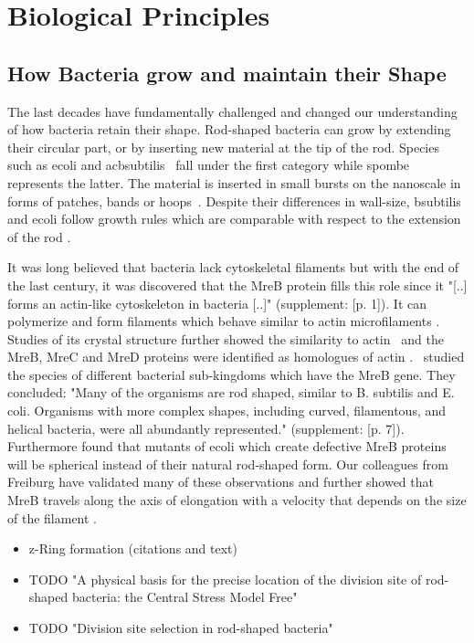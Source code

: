 \documentclass{article}
\begin{document}
\section{Biological Principles}
\subsection{How Bacteria grow and maintain their Shape}

The last decades have fundamentally challenged and changed our understanding of how bacteria retain
their shape.
Rod-shaped bacteria can grow by extending their circular part, or by inserting new material
at the tip of the rod.
Species such as \ac{ecoli} and ac{bsubtilis}~\cite{Errington2020} fall under the first category
while \ac{spombe} represents the latter.
The material is inserted in small bursts on the nanoscale in forms of patches, bands or
hoops~\cite{DePedro2003}.
Despite their differences in wall-size, \ac{bsubtilis} and \ac{ecoli} follow growth rules which are
comparable with respect to the extension of the rod \cite{Chang2014}.

It was long believed that bacteria lack cytoskeletal filaments but with the end of the last
century, it was discovered that the MreB protein fills this role since it "[..] forms an actin-like
cytoskeleton in bacteria [..]" \cite{Erickson2001} (supplement: [p. 1]).
It can polymerize and form filaments which behave similar to actin microfilaments \cite{Dersch2020}.
Studies of its crystal structure further showed the similarity to actin~\cite{vandenEnt2001} and the
MreB, MreC and MreD proteins were identified as homologues of actin \cite{Lowe2017_lj}.\
\cite{Jones2001} studied the species of different bacterial sub-kingdoms which have the MreB gene.
They concluded: "Many of the organisms are rod shaped, similar to B. subtilis and E. coli.
Organisms with more complex shapes, including curved, filamentous, and helical bacteria, were all
abundantly represented." \cite{Jones2001} (supplement: [p. 7]).
Furthermore \cite{Wachi1987} found that mutants of \ac{ecoli} which create defective MreB proteins will be
spherical instead of their natural rod-shaped form.
Our colleagues from Freiburg have validated many of these observations and further showed that MreB
travels along the axis of elongation with a velocity that depends on the size of the filament
\cite{Olshausen2013}.

\begin{itemize}
    \item z-Ring formation (citations and text)
    \item \cite{Koch1995} TODO "A physical basis for the precise location of the division site of rod-shaped bacteria: the Central Stress Model Free"
    \item \cite{Bramkamp2009} TODO "Division site selection in rod-shaped bacteria"
\end{itemize}
\end{document}
